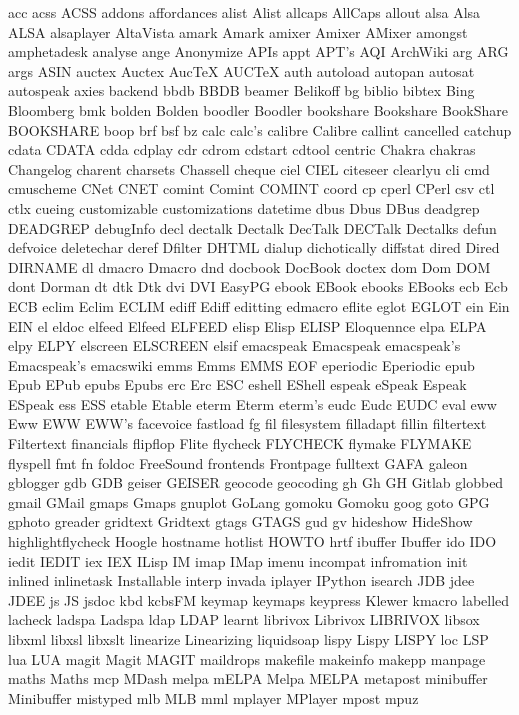 acc
acss
ACSS
addons
affordances
alist
Alist
allcaps
AllCaps
allout
alsa
Alsa
ALSA
alsaplayer
AltaVista
amark
Amark
amixer
Amixer
AMixer
amongst
amphetadesk
analyse
ange
Anonymize
APIs
appt
APT's
AQI
ArchWiki
arg
ARG
args
ASIN
auctex
Auctex
AucTeX
AUCTeX
auth
autoload
autopan
autosat
autospeak
axies
backend
bbdb
BBDB
beamer
Belikoff
bg
biblio
bibtex
Bing
Bloomberg
bmk
bolden
Bolden
boodler
Boodler
bookshare
Bookshare
BookShare
BOOKSHARE
boop
brf
bsf
bz
calc
calc's
calibre
Calibre
callint
cancelled
catchup
cdata
CDATA
cdda
cdplay
cdr
cdrom
cdstart
cdtool
centric
Chakra
chakras
Changelog
charent
charsets
Chassell
cheque
ciel
CIEL
citeseer
clearlyu
cli
cmd
cmuscheme
CNet
CNET
comint
Comint
COMINT
coord
cp
cperl
CPerl
csv
ctl
ctlx
cueing
customizable
customizations
datetime
dbus
Dbus
DBus
deadgrep
DEADGREP
debugInfo
decl
dectalk
Dectalk
DecTalk
DECTalk
Dectalks
defun
defvoice
deletechar
deref
Dfilter
DHTML
dialup
dichotically
diffstat
dired
Dired
DIRNAME
dl
dmacro
Dmacro
dnd
docbook
DocBook
doctex
dom
Dom
DOM
dont
Dorman
dt
dtk
Dtk
dvi
DVI
EasyPG
ebook
EBook
ebooks
EBooks
ecb
Ecb
ECB
eclim
Eclim
ECLIM
ediff
Ediff
editting
edmacro
eflite
eglot
EGLOT
ein
Ein
EIN
el
eldoc
elfeed
Elfeed
ELFEED
elisp
Elisp
ELISP
Eloquennce
elpa
ELPA
elpy
ELPY
elscreen
ELSCREEN
elsif
emacspeak
Emacspeak
emacspeak's
Emacspeak's
emacswiki
emms
Emms
EMMS
EOF
eperiodic
Eperiodic
epub
Epub
EPub
epubs
Epubs
erc
Erc
ESC
eshell
EShell
espeak
eSpeak
Espeak
ESpeak
ess
ESS
etable
Etable
eterm
Eterm
eterm's
eudc
Eudc
EUDC
eval
eww
Eww
EWW
EWW's
facevoice
fastload
fg
fil
filesystem
filladapt
fillin
filtertext
Filtertext
financials
flipflop
Flite
flycheck
FLYCHECK
flymake
FLYMAKE
flyspell
fmt
fn
foldoc
FreeSound
frontends
Frontpage
fulltext
GAFA
galeon
gblogger
gdb
GDB
geiser
GEISER
geocode
geocoding
gh
Gh
GH
Gitlab
globbed
gmail
GMail
gmaps
Gmaps
gnuplot
GoLang
gomoku
Gomoku
goog
goto
GPG
gphoto
greader
gridtext
Gridtext
gtags
GTAGS
gud
gv
hideshow
HideShow
highlightflycheck
Hoogle
hostname
hotlist
HOWTO
hrtf
ibuffer
Ibuffer
ido
IDO
iedit
IEDIT
iex
IEX
ILisp
IM
imap
IMap
imenu
incompat
infromation
init
inlined
inlinetask
Installable
interp
invada
iplayer
IPython
isearch
JDB
jdee
JDEE
js
JS
jsdoc
kbd
kcbsFM
keymap
keymaps
keypress
Klewer
kmacro
labelled
lacheck
ladspa
Ladspa
ldap
LDAP
learnt
librivox
Librivox
LIBRIVOX
libsox
libxml
libxsl
libxslt
linearize
Linearizing
liquidsoap
lispy
Lispy
LISPY
loc
LSP
lua
LUA
magit
Magit
MAGIT
maildrops
makefile
makeinfo
makepp
manpage
maths
Maths
mcp
MDash
melpa
mELPA
Melpa
MELPA
metapost
minibuffer
Minibuffer
mistyped
mlb
MLB
mml
mplayer
MPlayer
mpost
mpuz
